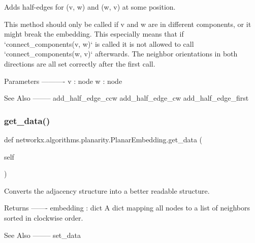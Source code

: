 \begin{DoxyVerb}Adds half-edges for (v, w) and (w, v) at some position.

This method should only be called if v and w are in different
components, or it might break the embedding.
This especially means that if `connect_components(v, w)`
is called it is not allowed to call `connect_components(w, v)`
afterwards. The neighbor orientations in both directions are
all set correctly after the first call.

Parameters
----------
v : node
w : node

See Also
--------
add_half_edge_ccw
add_half_edge_cw
add_half_edge_first
\end{DoxyVerb}
 \mbox{\label{classnetworkx_1_1algorithms_1_1planarity_1_1PlanarEmbedding_a23df90920ee302d2f8a5a0b93e352fa2}} 
\subsubsection{\texorpdfstring{get\+\_\+data()}{get\_data()}}
{\footnotesize\ttfamily def networkx.\+algorithms.\+planarity.\+Planar\+Embedding.\+get\+\_\+data (\begin{DoxyParamCaption}\item[{}]{self }\end{DoxyParamCaption})}

\begin{DoxyVerb}Converts the adjacency structure into a better readable structure.

Returns
-------
embedding : dict
    A dict mapping all nodes to a list of neighbors sorted in
    clockwise order.

See Also
--------
set_data\end{DoxyVerb}
 \mbox{\label{classnetworkx_1_1algorithms_1_1planarity_1_1PlanarEmbedding_a33736436ddce67cafd7effe227676773}} 

